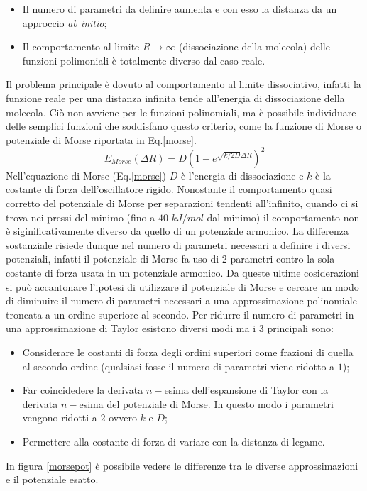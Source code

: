 \documentclass[oneside]{amsbook}
\numberwithin{section}{chapter}
\numberwithin{equation}{section}
\numberwithin{figure}{section}
\begin{document}
\begin{itemize}
\item Il numero di parametri da definire aumenta e con esso la distanza da un approccio \emph{ab initio};
\item Il comportamento al limite $R\rightarrow\infty$ (dissociazione della molecola) delle funzioni polimoniali è totalmente diverso dal caso reale.
\end{itemize}
Il problema principale è dovuto al comportamento al limite dissociativo, infatti la funzione reale per una distanza infinita tende all'energia di dissociazione della molecola. Ciò non avviene per le funzioni polinomiali, ma è possibile individuare delle semplici funzioni che soddisfano questo criterio, come la funzione di Morse o potenziale di Morse  riportata in Eq.\ref{morse}.
\begin{equation}
\label{morse}
E_{Morse}(\Delta R)= D(1-e^{\sqrt{k/2D}\Delta R})^2
\end{equation}
Nell'equazione di Morse (Eq.\ref{morse}) $D$ è l'energia di dissociazione e $k$ è la costante di forza dell'oscillatore rigido. Nonostante il comportamento quasi corretto del potenziale di Morse per separazioni tendenti all'infinito, quando ci si trova nei pressi del minimo (fino a $40$ $kJ/mol $ dal minimo) il comportamento non è siginificativamente diverso da quello di un potenziale armonico. La differenza sostanziale risiede dunque nel numero di parametri necessari a definire i diversi potenziali, infatti il potenziale di Morse fa uso di $2$ parametri contro la sola costante di forza usata in un potenziale armonico. Da queste ultime cosiderazioni si può accantonare l'ipotesi di utilizzare il potenziale di Morse e cercare un modo di diminuire il numero di parametri necessari a una approssimazione polinomiale troncata a un ordine superiore al secondo. 
Per ridurre il numero di parametri in una approssimazione di Taylor esistono diversi modi ma i $3$ principali sono:
\begin{itemize}
\item Considerare le costanti di forza degli ordini superiori come frazioni di quella al secondo ordine (qualsiasi fosse il numero di parametri viene ridotto a $1$);
\item Far coincidedere la derivata $n-$esima dell'espansione di Taylor con la derivata $n-$esima del potenziale di Morse. In questo modo i parametri vengono ridotti a $2$ ovvero $k$ e $D$;
\item Permettere alla costante di forza di variare con la distanza di legame.
\end{itemize}
In figura \ref{morsepot} è possibile vedere le differenze tra le diverse approssimazioni e il potenziale esatto.
\end{document}
